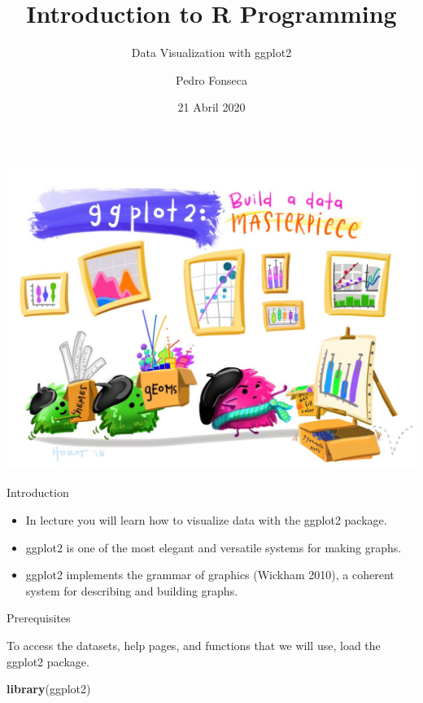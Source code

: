\documentclass[ignorenonframetext,]{beamer}
\title{Introduction to R Programming}
\subtitle{Data Visualization with ggplot2}
\author{Pedro Fonseca}
\date{21 Abril 2020}
\newenvironment{Shaded}{\begin{snugshade}}{\end{snugshade}}
\newcommand{\KeywordTok}[1]{\textcolor[rgb]{0.13,0.29,0.53}{\textbf{#1}}}
\newcommand{\NormalTok}[1]{#1}
\begin{document}
\frame{\titlepage}

\begin{frame}

\includegraphics{figures/pic.png}

\end{frame}

\begin{frame}{Introduction}
\protect\hypertarget{introduction}{}

\begin{itemize}
\item
  In lecture you will learn how to visualize data with the ggplot2
  package.
\item
  ggplot2 is one of the most elegant and versatile systems for making
  graphs.
\item
  ggplot2 implements the grammar of graphics (Wickham 2010), a coherent
  system for describing and building graphs.
\end{itemize}

\end{frame}

\begin{frame}[fragile]{Prerequisites}
\protect\hypertarget{prerequisites}{}

To access the datasets, help pages, and functions that we will use, load
the ggplot2 package.

\begin{Shaded}
\begin{Highlighting}[]
\KeywordTok{library}\NormalTok{(ggplot2)}
\end{Highlighting}
\end{Shaded}

\end{frame}
\end{document}
